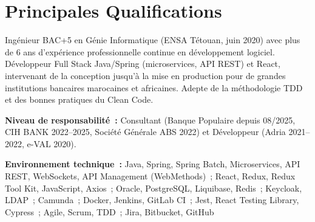 \section*{Principales Qualifications}

Ingénieur BAC+5 en Génie Informatique (ENSA Tétouan, juin 2020) avec plus de 6 ans d'expérience
professionnelle continue en développement logiciel. Développeur Full Stack Java/Spring
(microservices, API REST) et React, intervenant de la conception jusqu'à la mise en production
pour de grandes institutions bancaires marocaines et africaines. Adepte de la méthodologie TDD et
des bonnes pratiques du Clean Code.

\textbf{Niveau de responsabilité~:} Consultant (Banque Populaire depuis 08/2025, CIH BANK 2022--2025,
Société Générale ABS 2022) et Développeur (Adria 2021--2022, e-VAL 2020).

\textbf{Environnement technique~:} Java, Spring, Spring Batch, Microservices, API REST, WebSockets, API Management (WebMethods)~; React, Redux, Redux Tool Kit, JavaScript, Axios~; Oracle, PostgreSQL, Liquibase, Redis~; Keycloak, LDAP~; Camunda~; Docker, Jenkins, GitLab CI~; Jest, React Testing Library, Cypress~; Agile, Scrum, TDD~; Jira, Bitbucket, GitHub
